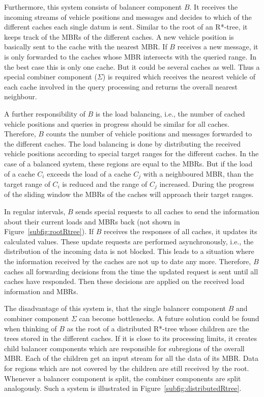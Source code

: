 Furthermore, this system consists of balancer component $B$. It
receives the incoming streams of vehicle positions and messages and
decides to which of the different caches each single datum is
sent. Similar to the root of an R*-tree, it keeps track of the MBRs of
the different caches. A new vehicle position is basically sent to the
cache with the nearest MBR. If $B$ receives a new message, it is only
forwarded to the caches whose MBR intersects with the queried
range. In the best case this is only one cache. But it could be
several caches as well. Thus a special combiner component ($\Sigma$)
is required which receives the nearest vehicle of each cache involved
in the query processing and returns the overall nearest neighbour.

A further responsibility of $B$ is the load balancing, i.e., the
number of cached vehicle positions and queries in progress should be
similar for all caches. Therefore, $B$ counts the number of vehicle
positions and messages forwarded to the different caches. The load
balancing is done by distributing the received vehicle positions
according to special target ranges for the different caches. In the
case of a balanced system, these regions are equal to the MBRs. But if
the load of a cache $C_i$ exceeds the load of a cache $C_j$ with a
neighboured MBR, than the target range of $C_i$ is reduced and the
range of $C_j$ increased. During the progress of the sliding window
the MBRs of the caches will approach their target ranges.

In regular intervals, $B$ sends special requests to all caches to send
the information about their current loads and MBRs back (not shown in
Figure~\ref{subfig:rootRtree}). If $B$ receives the responses of all
caches, it updates its calculated values. These update requests are
performed asynchronously, i.e., the distribution of the incoming data
is not blocked. This leads to a situation where the information
received by the caches are not up to date any more. Therefore, $B$
caches all forwarding decisions from the time the updated request is
sent until all caches have responded. Then these decisions are applied
on the received load information and MBRs.

The disadvantage of this system is, that the single balancer component
$B$ and combiner component $\Sigma$ can become bottlenecks. A future
solution could be found when thinking of $B$ as the root of a
distributed R*-tree whose children are the trees stored in the
different caches. If it is close to its processing limits, it creates
child balancer components which are responsible for subregions of the
overall MBR. Each of the children get an input stream for all the data
of its MBR. Data for regions which are not covered by the children are
still received by the root. Whenever a balancer component is split,
the combiner components are split analogously. Such a system is
illustrated in Figure~\ref{subfig:distributedRtree}.
